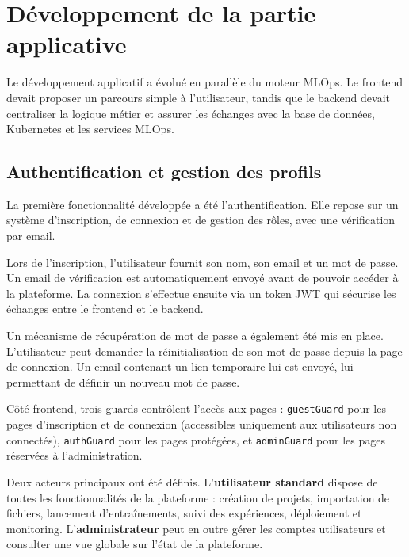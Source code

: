 
\section{Développement de la partie applicative}
\label{sec:sprint2-developpement-applicatif}

Le développement applicatif a évolué en parallèle du moteur MLOps.
Le frontend devait proposer un parcours simple à l'utilisateur, tandis
que le backend devait centraliser la logique métier et assurer les
échanges avec la base de données, Kubernetes et les services MLOps.


\subsection{Authentification et gestion des profils}
\label{subsec:sprint2-auth}

La première fonctionnalité développée a été l'authentification. Elle
repose sur un système d'inscription, de connexion et de gestion des
rôles, avec une vérification par email.

Lors de l'inscription, l'utilisateur fournit son nom, son email et
un mot de passe. Un email de vérification est automatiquement envoyé
avant de pouvoir accéder à la plateforme. La connexion s'effectue
ensuite via un token JWT qui sécurise les échanges entre le frontend
et le backend.

Un mécanisme de récupération de mot de passe a également été mis en
place. L'utilisateur peut demander la réinitialisation de son mot de
passe depuis la page de connexion. Un email contenant un lien
temporaire lui est envoyé, lui permettant de définir un nouveau mot
de passe.

Côté frontend, trois guards contrôlent l'accès aux pages :
\texttt{guestGuard} pour les pages d'inscription et de connexion
(accessibles uniquement aux utilisateurs non connectés),
\texttt{authGuard} pour les pages protégées, et
\texttt{adminGuard} pour les pages réservées à l'administration.

Deux acteurs principaux ont été définis. L'\textbf{utilisateur
standard} dispose de toutes les fonctionnalités de la plateforme :
création de projets, importation de fichiers, lancement d'entraînements,
suivi des expériences, déploiement et monitoring. L'\textbf{administrateur}
peut en outre gérer les comptes utilisateurs et consulter une vue
globale sur l'état de la plateforme.

